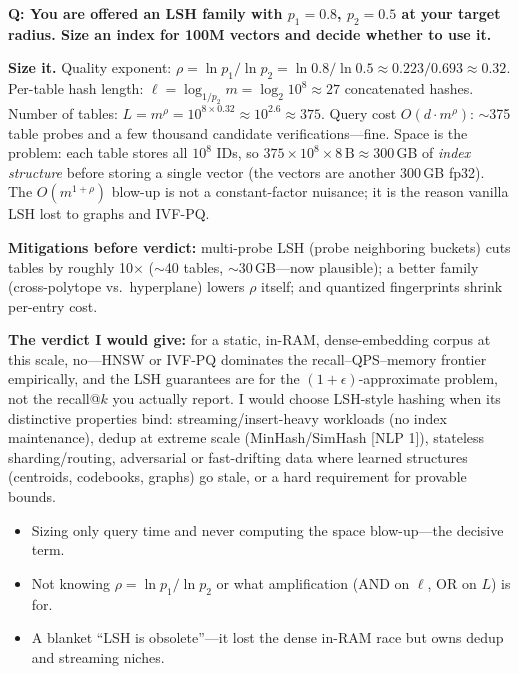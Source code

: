 \begin{interviewq}
\textbf{Q: You are offered an LSH family with $p_1 = 0.8$, $p_2 = 0.5$ at your target radius. Size an index for 100M vectors and decide whether to use it.}

 \quad {} \quad \badgefreq{\freqlow}

\stronganswer

\textbf{Size it.} Quality exponent: $\rho = \ln p_1 / \ln p_2 = \ln 0.8 / \ln 0.5 \approx 0.223/0.693 \approx 0.32$. Per-table hash length: $\ell = \log_{1/p_2} m = \log_2 10^8 \approx 27$ concatenated hashes. Number of tables: $L = m^{\rho} = 10^{8 \times 0.32} \approx 10^{2.6} \approx 375$. Query cost $O(d \cdot m^{\rho})$: $\sim$375 table probes and a few thousand candidate verifications---fine. Space is the problem: each table stores all $10^8$ IDs, so $375 \times 10^8 \times 8\,\mathrm{B} \approx 300$\,GB of \emph{index structure} before storing a single vector (the vectors are another 300\,GB fp32). The $O(m^{1+\rho})$ blow-up is not a constant-factor nuisance; it is the reason vanilla LSH lost to graphs and IVF-PQ.

\textbf{Mitigations before verdict:} multi-probe LSH (probe neighboring buckets) cuts tables by roughly 10$\times$ ($\sim$40 tables, $\sim$30\,GB---now plausible); a better family (cross-polytope vs.\ hyperplane) lowers $\rho$ itself; and quantized fingerprints shrink per-entry cost.

\textbf{The verdict I would give:} for a static, in-RAM, dense-embedding corpus at this scale, no---HNSW or IVF-PQ dominates the recall--QPS--memory frontier empirically, and the LSH guarantees are for the $(1+\epsilon)$-approximate problem, not the recall@$k$ you actually report. I would choose LSH-style hashing when its distinctive properties bind: streaming/insert-heavy workloads (no index maintenance), dedup at extreme scale (MinHash/SimHash [NLP 1]), stateless sharding/routing, adversarial or fast-drifting data where learned structures (centroids, codebooks, graphs) go stale, or a hard requirement for provable bounds.

\redflags
\begin{itemize}
    \item Sizing only query time and never computing the space blow-up---the decisive term.
    \item Not knowing $\rho = \ln p_1/\ln p_2$ or what amplification (AND on $\ell$, OR on $L$) is for.
    \item A blanket ``LSH is obsolete''---it lost the dense in-RAM race but owns dedup and streaming niches.
\end{itemize}


\end{interviewq}
